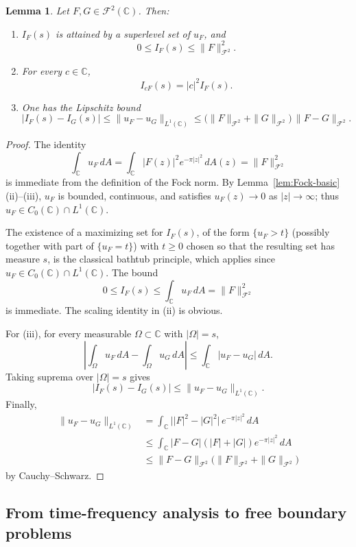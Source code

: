 \documentclass[a4paper,11pt,reqno]{amsart}
\numberwithin{equation}{section}
\theoremstyle{plain} %
\newtheorem{lemma}{Lemma}[section]
\theoremstyle{definition} %
\theoremstyle{remark}
\newcommand{\C}{\mathbb{C}}
\begin{document}
\begin{lemma}\label{lem:basic-properties-global}
Let \(F,G\in \mathcal F^2(\C)\). Then:
\begin{enumerate}
    \item[(i)] \(I_F(s)\) is attained by a superlevel set of \(u_F\), and
    \[
    0\le I_F(s)\le \|F\|_{\mathcal F^2}^2.
    \]
    \item[(ii)] For every \(c\in \C\),
    \[
    I_{cF}(s)=|c|^2 I_F(s).
    \]
    \item[(iii)] One has the Lipschitz bound
    \[
    |I_F(s)-I_G(s)|
    \le
    \|u_F-u_G\|_{L^1(\C)}
    \le
    \big(\|F\|_{\mathcal F^2}+\|G\|_{\mathcal F^2}\big)\,
    \|F-G\|_{\mathcal F^2}.
    \]
\end{enumerate}
\end{lemma}

\begin{proof}
The identity
\[
\int_\C u_F\,dA=\int_\C |F(z)|^2e^{-\pi |z|^2}\,dA(z)=\|F\|_{\mathcal F^2}^2
\]
is immediate from the definition of the Fock norm. By
Lemma~\ref{lem:Fock-basic}(ii)--(iii), \(u_F\) is bounded, continuous, and
satisfies \(u_F(z)\to 0\) as \(|z|\to\infty\); thus
\(u_F\in C_0(\C)\cap L^1(\C)\).

The existence of a maximizing set for \(I_F(s)\), of the form
\(\{u_F>t\}\) (possibly together with part of \(\{u_F=t\}\)) with \(t\geq 0\)
chosen so that the resulting set has measure \(s\), is the classical bathtub
principle, which applies since \(u_F\in C_0(\C)\cap L^1(\C)\). The bound
\[
0\le I_F(s)\le \int_\C u_F\,dA=\|F\|_{\mathcal F^2}^2
\]
is immediate. The scaling identity in (ii) is obvious.

For (iii), for every measurable \(\Omega\subset \C\) with \(|\Omega|=s\),
\[
\left|\int_\Omega u_F\,dA-\int_\Omega u_G\,dA\right|
\le \int_\C |u_F-u_G|\,dA.
\]
Taking suprema over \(|\Omega|=s\) gives
\[
|I_F(s)-I_G(s)|\le \|u_F-u_G\|_{L^1(\C)}.
\]
Finally,
\begin{align*}
\|u_F-u_G\|_{L^1(\C)}
&=
\int_\C \big||F|^2-|G|^2\big|\,e^{-\pi |z|^2}\,dA \\
&\le
\int_\C |F-G|(|F|+|G|)e^{-\pi |z|^2}\,dA \\
&\le
\|F-G\|_{\mathcal F^2}\big(\|F\|_{\mathcal F^2}+\|G\|_{\mathcal F^2}\big)
\end{align*}
by Cauchy--Schwarz.
\end{proof}

\subsection{From time-frequency analysis to free boundary problems}\label{sec:fourier-to-fboundary}
\end{document}
